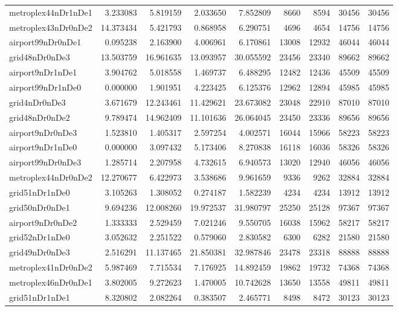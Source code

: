 \begin{longtable}{|l|r|r|r|r|r|r|r|r|}
metroplex44nDr1nDe1 & 3.233083 & 5.819159 & 2.033650 & 7.852809 & 8660 & 8594 & 30456 & 30456 \\
metroplex43nDr0nDe2 & 14.373434 & 5.421793 & 0.868958 & 6.290751 & 4696 & 4654 & 14756 & 14756 \\
airport99nDr0nDe1 & 0.095238 & 2.163900 & 4.006961 & 6.170861 & 13008 & 12932 & 46044 & 46044 \\
grid48nDr0nDe3 & 13.503759 & 16.961635 & 13.093957 & 30.055592 & 23456 & 23340 & 89662 & 89662 \\
airport9nDr1nDe1 & 3.904762 & 5.018558 & 1.469737 & 6.488295 & 12482 & 12436 & 45509 & 45509 \\
airport99nDr1nDe0 & 0.000000 & 1.901951 & 4.223425 & 6.125376 & 12962 & 12894 & 45985 & 45985 \\
grid4nDr0nDe3 & 3.671679 & 12.243461 & 11.429621 & 23.673082 & 23048 & 22910 & 87010 & 87010 \\
grid48nDr0nDe2 & 9.789474 & 14.962409 & 11.101636 & 26.064045 & 23450 & 23336 & 89656 & 89656 \\
airport9nDr0nDe3 & 1.523810 & 1.405317 & 2.597254 & 4.002571 & 16044 & 15966 & 58223 & 58223 \\
airport9nDr1nDe0 & 0.000000 & 3.097432 & 5.173406 & 8.270838 & 16118 & 16036 & 58326 & 58326 \\
airport99nDr0nDe3 & 1.285714 & 2.207958 & 4.732615 & 6.940573 & 13020 & 12940 & 46056 & 46056 \\
metroplex44nDr0nDe2 & 12.270677 & 6.422973 & 3.538686 & 9.961659 & 9336 & 9262 & 32884 & 32884 \\
grid51nDr1nDe0 & 3.105263 & 1.308052 & 0.274187 & 1.582239 & 4234 & 4234 & 13912 & 13912 \\
grid50nDr0nDe1 & 9.694236 & 12.008260 & 19.972537 & 31.980797 & 25250 & 25128 & 97367 & 97367 \\
airport9nDr0nDe2 & 1.333333 & 2.529459 & 7.021246 & 9.550705 & 16038 & 15962 & 58217 & 58217 \\
grid52nDr1nDe0 & 3.052632 & 2.251522 & 0.579060 & 2.830582 & 6300 & 6282 & 21580 & 21580 \\
grid49nDr0nDe3 & 2.516291 & 11.137465 & 21.850381 & 32.987846 & 23478 & 23318 & 88888 & 88888 \\
metroplex41nDr0nDe2 & 5.987469 & 7.715534 & 7.176925 & 14.892459 & 19862 & 19732 & 74368 & 74368 \\
metroplex46nDr0nDe1 & 3.802005 & 9.272623 & 1.470005 & 10.742628 & 13650 & 13558 & 49811 & 49811 \\
grid51nDr1nDe1 & 8.320802 & 2.082264 & 0.383507 & 2.465771 & 8498 & 8472 & 30123 & 30123 \\

\end{longtable}
